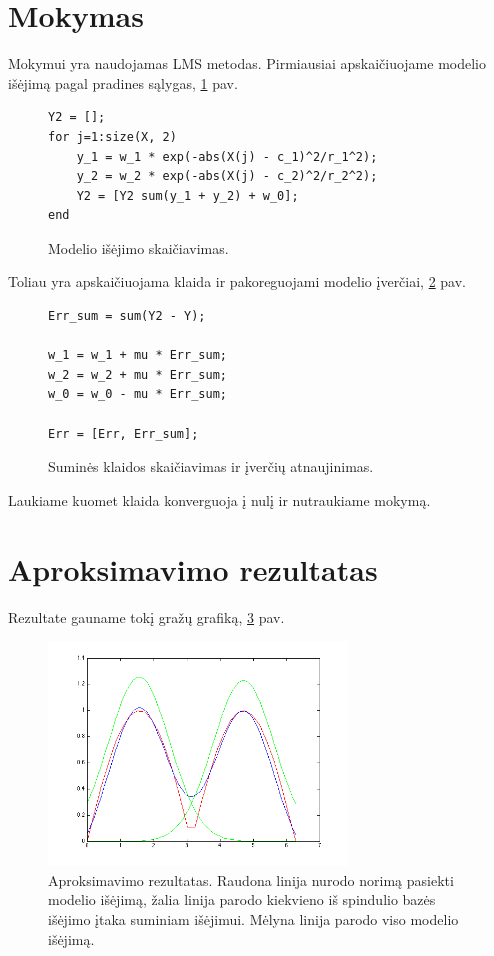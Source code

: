 \documentclass[11pt, a4paper, lithuanian]{article}
\begin{document}
    \section{Mokymas}

    Mokymui yra naudojamas LMS metodas. Pirmiausiai apskaičiuojame modelio išėjimą pagal pradines sąlygas, \ref{code:modelio_isejimo_skaiciavimas} pav.

    \begin{figure}[h]
      \centering
      \caption{Modelio išėjimo skaičiavimas.}
      \label{code:modelio_isejimo_skaiciavimas}
      \begin{lstlisting}
Y2 = [];
for j=1:size(X, 2)
    y_1 = w_1 * exp(-abs(X(j) - c_1)^2/r_1^2);
    y_2 = w_2 * exp(-abs(X(j) - c_2)^2/r_2^2);
    Y2 = [Y2 sum(y_1 + y_2) + w_0];
end
      \end{lstlisting}
    \end{figure}

    Toliau yra apskaičiuojama klaida ir pakoreguojami modelio įverčiai, \ref{code:sumines_klaidos_skaiciavimas} pav.

    \begin{figure}[h]
      \centering
      \caption{Suminės klaidos skaičiavimas ir įverčių atnaujinimas.}
      \label{code:sumines_klaidos_skaiciavimas}
      \begin{lstlisting}
Err_sum = sum(Y2 - Y);
    
w_1 = w_1 + mu * Err_sum;
w_2 = w_2 + mu * Err_sum;
w_0 = w_0 - mu * Err_sum;

Err = [Err, Err_sum];
      \end{lstlisting}
    \end{figure}

    Laukiame kuomet klaida konverguoja į nulį ir nutraukiame mokymą. 

    \section{Aproksimavimo rezultatas}

    Rezultate gauname tokį gražų grafiką, \ref{fig:aproksimavimo_rezultatas} pav.

    \begin{figure}[!ht]
      \centering
      \includegraphics[width=300px]{img/rezultatas.png}
      \caption{Aproksimavimo rezultatas. Raudona linija nurodo norimą pasiekti modelio išėjimą, žalia linija parodo kiekvieno iš spindulio bazės išėjimo įtaka suminiam išėjimui. Mėlyna linija parodo viso modelio išėjimą.}
      \label{fig:aproksimavimo_rezultatas}
    \end{figure}
\end{document}
